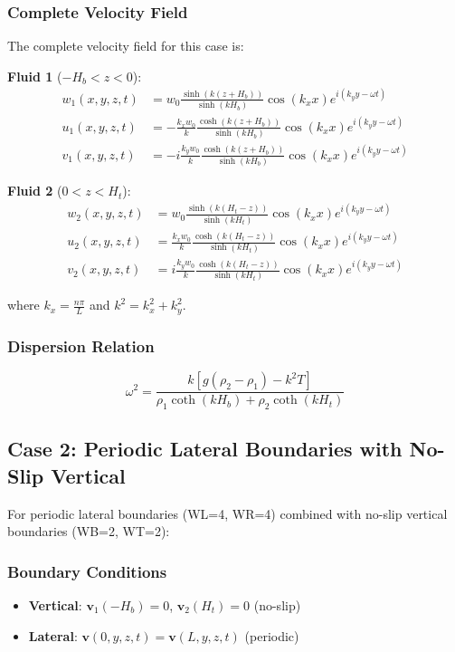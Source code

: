 \documentclass[12pt,a4paper]{article}
\begin{document}
\subsubsection{Complete Velocity Field}

The complete velocity field for this case is:

\textbf{Fluid 1} ($-H_b < z < 0$):
\begin{align}
w_1(x,y,z,t) &= w_0 \frac{\sinh(k(z + H_b))}{\sinh(kH_b)} \cos(k_x x) e^{i(k_y y - \omega t)} \\
u_1(x,y,z,t) &= -\frac{k_x w_0}{k} \frac{\cosh(k(z + H_b))}{\sinh(kH_b)} \cos(k_x x) e^{i(k_y y - \omega t)} \\
v_1(x,y,z,t) &= -i\frac{k_y w_0}{k} \frac{\cosh(k(z + H_b))}{\sinh(kH_b)} \cos(k_x x) e^{i(k_y y - \omega t)}
\end{align}

\textbf{Fluid 2} ($0 < z < H_t$):
\begin{align}
w_2(x,y,z,t) &= w_0 \frac{\sinh(k(H_t - z))}{\sinh(kH_t)} \cos(k_x x) e^{i(k_y y - \omega t)} \\
u_2(x,y,z,t) &= \frac{k_x w_0}{k} \frac{\cosh(k(H_t - z))}{\sinh(kH_t)} \cos(k_x x) e^{i(k_y y - \omega t)} \\
v_2(x,y,z,t) &= i\frac{k_y w_0}{k} \frac{\cosh(k(H_t - z))}{\sinh(kH_t)} \cos(k_x x) e^{i(k_y y - \omega t)}
\end{align}

where $k_x = \frac{n\pi}{L}$ and $k^2 = k_x^2 + k_y^2$.

\subsubsection{Dispersion Relation}
\begin{equation}
\omega^2 = \frac{k[g(\rho_2 - \rho_1) - k^2T]}{\rho_1\coth(kH_b) + \rho_2\coth(kH_t)}
\end{equation}

\subsection{Case 2: Periodic Lateral Boundaries with No-Slip Vertical}

For periodic lateral boundaries (WL=4, WR=4) combined with no-slip vertical boundaries (WB=2, WT=2):

\subsubsection{Boundary Conditions}
\begin{itemize}
    \item \textbf{Vertical}: $\mathbf{v}_1(-H_b) = 0$, $\mathbf{v}_2(H_t) = 0$ (no-slip)
    \item \textbf{Lateral}: $\mathbf{v}(0,y,z,t) = \mathbf{v}(L,y,z,t)$ (periodic)
\end{itemize}
\end{document}
